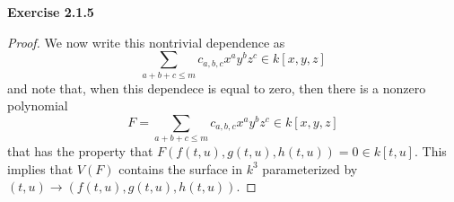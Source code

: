 \documentclass[12pt,oneside]{article}
\newenvironment{exercise}[1]{\vspace{.1in}\noindent\textbf{Exercise #1 \hspace{.05em}}}{}
\begin{document}
\begin{exercise}{2.1.5}
\begin{proof}
        We now write this nontrivial dependence as 
        \[
            \sum_{a+b+c\leq m}c_{a,b,c}x^ay^bz^c \in k[x,y,z]    
        \]
        and note that, when this dependece is equal to zero, then there is 
        a nonzero polynomial 
        \[
            F = \sum_{a+b+c\leq m}c_{a,b,c}x^ay^bz^c \in k[x,y,z]    
        \]
        that has the property that $F(f(t,u),g(t,u),h(t,u)) = 0 \in k[t,u]$.
        This implies that $V(F)$ contains the surface in $k^3$ parameterized 
        by $(t,u) \to (f(t,u),g(t,u),h(t,u))$.
    \end{proof}
\end{exercise}


\end{document}
